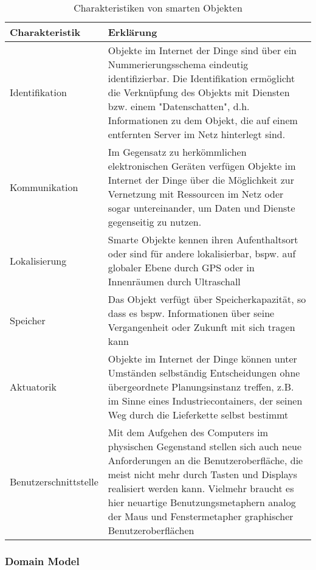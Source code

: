 \documentclass[a4paper, 12pt, twoside, headsepline=true]{scrartcl} %
\begin{document}
\begin{table}[H]
	\begin{tabularx}{\textwidth}{@{}lL@{}} 
		\toprule
		Charakteristik & Erklärung 
		\\ \midrule
		Identifikation & Objekte im Internet der Dinge sind über ein Nummerierungsschema eindeutig identifizierbar. Die Identifikation ermöglicht die Verknüpfung des Objekts mit Diensten bzw. einem "Datenschatten", d.h. Informationen zu dem Objekt, die auf einem entfernten Server im Netz hinterlegt sind. 
		\\ \hline
		Kommunikation & Im Gegensatz zu herkömmlichen elektronischen Geräten verfügen Objekte im Internet der Dinge über die Möglichkeit zur Vernetzung mit Ressourcen im Netz oder sogar untereinander, um Daten und Dienste gegenseitig zu nutzen. 
		\\ \hline
		Lokalisierung & Smarte Objekte kennen ihren Aufenthaltsort oder sind für andere lokalisierbar, bspw. auf globaler Ebene durch GPS oder in Innenräumen durch Ultraschall 
		\\ \hline
		Speicher & Das Objekt verfügt über Speicherkapazität, so dass es bspw. Informationen über seine Vergangenheit oder Zukunft mit sich tragen kann
		 \\ \hline
		Aktuatorik & Objekte im Internet der Dinge können unter Umständen selbständig Entscheidungen ohne übergeordnete Planungsinstanz treffen, z.B. im Sinne eines Industriecontainers, der seinen Weg durch die Lieferkette selbst bestimmt
		\\ \hline
		Benutzerschnittstelle & Mit dem Aufgehen des Computers im physischen Gegenstand stellen sich auch neue Anforderungen an die Benutzeroberfläche, die meist nicht mehr durch Tasten und Displays realisiert werden kann. Vielmehr braucht es hier neuartige Benutzungsmetaphern analog der Maus und Fenstermetapher graphischer Benutzeroberflächen
		\\ \hline
		\bottomrule
	\end{tabularx}
	\caption{Charakteristiken von smarten Objekten}
	\label{table:smartObjectsCharacteristics}
\end{table}

\subsubsection{Domain Model}
\end{document}
